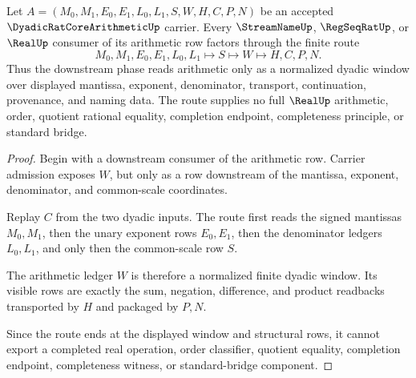 \begin{theorem}
\label{thm:dyadic-rat-core-arithmetic-normalization-handoff}
Let $A=(M_0,M_1,E_0,E_1,L_0,L_1,S,W,H,C,P,N)$ be an accepted $\DyadicRatCoreArithmeticUp$ carrier. Every $\StreamNameUp$, $\RegSeqRatUp$, or $\RealUp$ consumer of its arithmetic row factors through the finite route
$$
M_0,M_1,E_0,E_1,L_0,L_1 \longmapsto S \longmapsto W \longmapsto H,C,P,N .
$$
Thus the downstream phase reads arithmetic only as a normalized dyadic window over displayed mantissa, exponent, denominator, transport, continuation, provenance, and naming data. The route supplies no full $\RealUp$ arithmetic, order, quotient rational equality, completion endpoint, completeness principle, or standard bridge.
\end{theorem}
\begin{proof}
Begin with a downstream consumer of the arithmetic row. Carrier admission exposes $W$, but only as a row downstream of the mantissa, exponent, denominator, and common-scale coordinates.

Replay $C$ from the two dyadic inputs. The route first reads the signed mantissas $M_0,M_1$, then the unary exponent rows $E_0,E_1$, then the denominator ledgers $L_0,L_1$, and only then the common-scale row $S$.

The arithmetic ledger $W$ is therefore a normalized finite dyadic window. Its visible rows are exactly the sum, negation, difference, and product readbacks transported by $H$ and packaged by $P,N$.

Since the route ends at the displayed window and structural rows, it cannot export a completed real operation, order classifier, quotient equality, completion endpoint, completeness witness, or standard-bridge component.
\end{proof}

\begin{closurestatus}{\DyadicRatCoreArithmeticUp}
  \theoryclosure{\seedClosure}
  \formalstatus{\formalTargetV}
\end{closurestatus}
